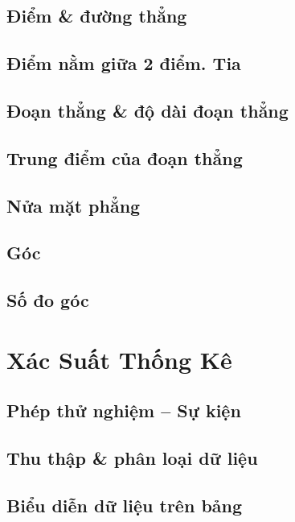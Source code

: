 \documentclass{article}
\numberwithin{equation}{section}
\begin{document}
\subsection{Điểm \& đường thẳng}

\subsection{Điểm nằm giữa 2 điểm. Tia}

\subsection{Đoạn thẳng \& độ dài đoạn thẳng}

\subsection{Trung điểm của đoạn thẳng}

\subsection{Nửa mặt phẳng}

\subsection{Góc}

\subsection{Số đo góc}


\section{Xác Suất Thống Kê}

\subsection{Phép thử nghiệm -- Sự kiện}

\subsection{Thu thập \& phân loại dữ liệu}

\subsection{Biểu diễn dữ liệu trên bảng}
\end{document}
